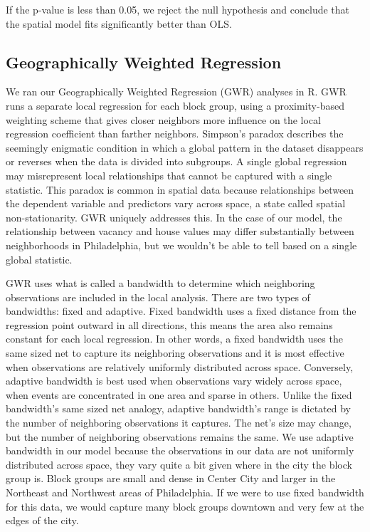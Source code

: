 \documentclass[
  12pt,
]{article}
\begin{document}
If the p-value is less than 0.05, we reject the null hypothesis and
conclude that the spatial model fits significantly better than OLS.

\subsection{Geographically Weighted
Regression}\label{geographically-weighted-regression}

We ran our Geographically Weighted Regression (GWR) analyses in R. GWR
runs a separate local regression for each block group, using a
proximity-based weighting scheme that gives closer neighbors more
influence on the local regression coefficient than farther neighbors.
Simpson's paradox describes the seemingly enigmatic condition in which a
global pattern in the dataset disappears or reverses when the data is
divided into subgroups. A single global regression may misrepresent
local relationships that cannot be captured with a single statistic.
This paradox is common in spatial data because relationships between the
dependent variable and predictors vary across space, a state called
spatial non-stationarity. GWR uniquely addresses this. In the case of
our model, the relationship between vacancy and house values may differ
substantially between neighborhoods in Philadelphia, but we wouldn't be
able to tell based on a single global statistic.

GWR uses what is called a bandwidth to determine which neighboring
observations are included in the local analysis. There are two types of
bandwidths: fixed and adaptive. Fixed bandwidth uses a fixed distance
from the regression point outward in all directions, this means the area
also remains constant for each local regression. In other words, a fixed
bandwidth uses the same sized net to capture its neighboring
observations and it is most effective when observations are relatively
uniformly distributed across space. Conversely, adaptive bandwidth is
best used when observations vary widely across space, when events are
concentrated in one area and sparse in others. Unlike the fixed
bandwidth's same sized net analogy, adaptive bandwidth's range is
dictated by the number of neighboring observations it captures. The
net's size may change, but the number of neighboring observations
remains the same. We use adaptive bandwidth in our model because the
observations in our data are not uniformly distributed across space,
they vary quite a bit given where in the city the block group is. Block
groups are small and dense in Center City and larger in the Northeast
and Northwest areas of Philadelphia. If we were to use fixed bandwidth
for this data, we would capture many block groups downtown and very few
at the edges of the city.
\end{document}
